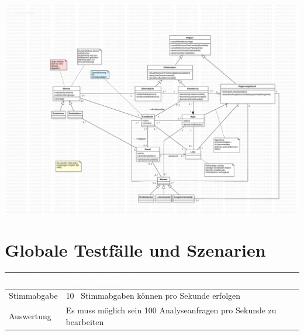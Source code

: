 \documentclass[a4paper,12pt]{article}
\begin{document}
\begin{center}
	\includegraphics[page=2,width=\textwidth]{../model.pdf}
\end{center}

\section{Globale Testfälle und Szenarien}
\begin{center}
      \begin{tabular}{|m{3.5cm}|m{12cm}|}
        \hline
        \rowcolor{TUMBlue} \textcolor{white}{\textbf{Szenario}} & \textcolor{white}{\textbf{Abnahmekriterium}} \\
        \hline
        Stimmabgabe & 10~ Stimmabgaben können pro Sekunde erfolgen \\
        \hline
        Auswertung & Es muss möglich sein 100 Analyseanfragen pro Sekunde zu bearbeiten \\
        \hline
      \end{tabular}
\end{center}

\clearpage

\end{document}
